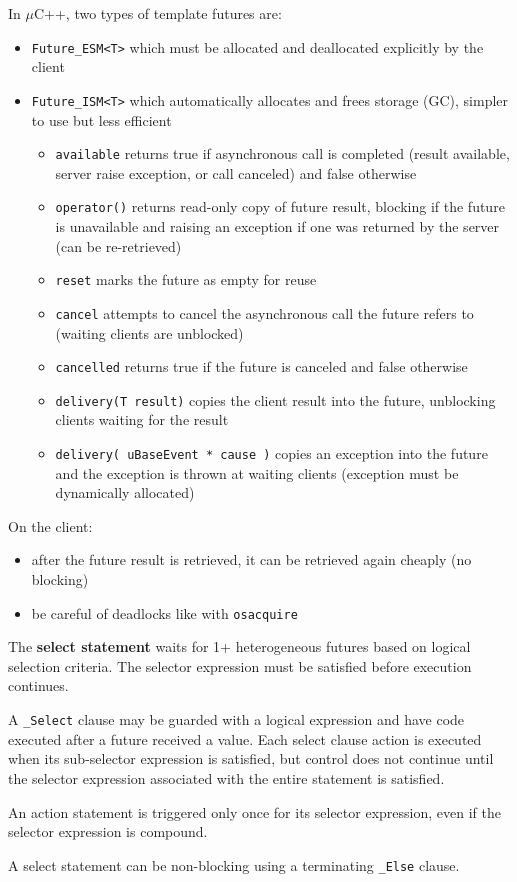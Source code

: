 \documentclass[11pt]{article}
\begin{document}
In \(\mu\)C++, two types of template futures are:
\begin{itemize}
\item \texttt{Future\_ESM<T>} which must be allocated and deallocated explicitly by the client
\item \texttt{Future\_ISM<T>} which automatically allocates and frees storage (GC), simpler to use but less efficient
\begin{itemize}
\item \texttt{available} returns true if asynchronous call is completed (result available, server
raise exception, or call canceled) and false otherwise
\item \texttt{operator()} returns read-only copy of future result, blocking if the future is unavailable
and raising an exception if one was returned by the server (can be re-retrieved)
\item \texttt{reset} marks the future as empty for reuse
\item \texttt{cancel} attempts to cancel the asynchronous call the future refers to (waiting clients
are unblocked)
\item \texttt{cancelled} returns true if the future is canceled and false otherwise
\item \texttt{delivery(T result)} copies the client result into the future, unblocking clients waiting
for the result
\item \texttt{delivery( uBaseEvent * cause )} copies an exception into the future and the exception is
thrown at waiting clients (exception must be dynamically allocated)
\end{itemize}
\end{itemize}

On the client:
\begin{itemize}
\item after the future result is retrieved, it can be retrieved again cheaply (no blocking)
\item be careful of deadlocks like with \texttt{osacquire}
\end{itemize}

The \textbf{select statement} waits for 1+ heterogeneous futures based on logical selection criteria.
The selector expression must be satisfied before execution continues.

A \texttt{\_Select} clause may be guarded with a logical expression and have code executed after a future
received a value.
Each select clause action is executed when its sub-selector expression is satisfied, but control
does not continue until the selector expression associated with the entire statement is satisfied.

An action statement is triggered only once for its selector expression, even if the selector
expression is compound.

A select statement can be non-blocking using a terminating \texttt{\_Else} clause.
\end{document}
